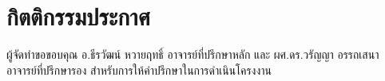 \section{กิตติกรรมประกาศ}
ผู้จัดทำขอขอบคุณ อ.ธีรวัฒน์ หวายฤทธิ์ อาจารย์ที่ปรึกษาหลัก และ
ผศ.ดร.วรัญญา อรรถเสนา อาจารย์ที่ปรึกษารอง สำหรับการให้คำปรึกษาในการดำเนินโครงงาน
